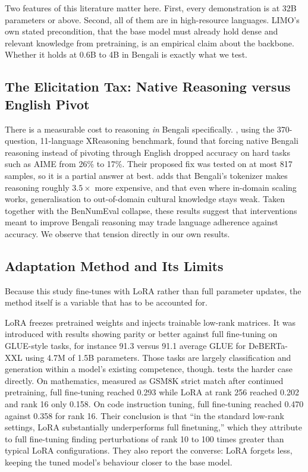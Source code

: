 Two features of this literature matter here. First, every demonstration is at
32B parameters or above. Second, all of them are in high-resource languages.
LIMO's own stated precondition, that the base model must already hold dense and
relevant knowledge from pretraining, is an empirical claim about the backbone.
Whether it holds at 0.6B to 4B in Bengali is exactly what we test.

\subsection{The Elicitation Tax: Native Reasoning versus English Pivot}

There is a measurable cost to reasoning \emph{in} Bengali specifically.
\textcite{qi2025xreasoning}, using the 370-question, 11-language XReasoning
benchmark, found that forcing native Bengali reasoning instead of pivoting
through English dropped accuracy on hard tasks such as AIME from 26\% to 17\%.
Their proposed fix was tested on at most 817 samples, so it is a partial answer
at best. \textcite{yong2025crosslingual} adds that Bengali's tokenizer makes
reasoning roughly $3.5\times$ more expensive, and that even where in-domain
scaling works, generalisation to out-of-domain cultural knowledge stays weak.
Taken together with the BenNumEval collapse, these results suggest that
interventions meant to improve Bengali reasoning may trade language adherence
against accuracy. We observe that tension directly in our own results.

\subsection{Adaptation Method and Its Limits}

Because this study fine-tunes with LoRA rather than full parameter updates, the
method itself is a variable that has to be accounted for.

LoRA \parencite{hu2021lora} %
freezes pretrained weights and injects trainable low-rank matrices. It was
introduced with results showing parity or better against full fine-tuning on
GLUE-style tasks, for instance 91.3 versus 91.1 average GLUE for DeBERTa-XXL
using 4.7M of 1.5B parameters. Those tasks are largely classification and
generation within a model's existing competence, though.
\textcite{biderman2024lora} %
tests the harder case directly. On mathematics, measured as GSM8K strict match
after continued pretraining, full fine-tuning reached 0.293 while LoRA at rank
256 reached 0.202 and rank 16 only 0.158. On code instruction tuning, full
fine-tuning reached 0.470 against 0.358 for rank 16. Their conclusion is that
``in the standard low-rank settings, LoRA substantially underperforms full
finetuning,'' which they attribute to full fine-tuning finding perturbations of
rank 10 to 100 times greater than typical LoRA configurations. They also report
the converse: LoRA forgets less, keeping the tuned model's behaviour closer to
the base model.

